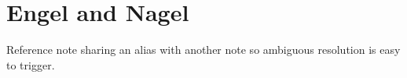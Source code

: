 
\section{Engel and Nagel}

Reference note sharing an alias with another note so ambiguous resolution is
easy to trigger.
